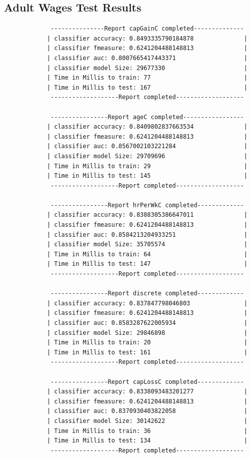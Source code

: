 \documentclass[a4paper,11pt]{scrreprt}
\begin{document}
\subsection{Adult Wages Test Results}
\begin{verbatim}
			 ---------------Report capGainC completed--------------
			| classifier accuracy: 0.8493335790184878              |
			| classifier fmeasure: 0.6241204488148813              |
			| classifier auc: 0.8007665417443371                   |
			| classifier model Size: 29677330                      |
			| Time in Millis to train: 77                          |
			| Time in Millis to test: 167                          |
			 -------------------Report completed-------------------

			 ----------------Report ageC completed-----------------
			| classifier accuracy: 0.8409802837663534              |
			| classifier fmeasure: 0.6241204488148813              |
			| classifier auc: 0.8567002103221284                   |
			| classifier model Size: 29709696                      |
			| Time in Millis to train: 29                          |
			| Time in Millis to test: 145                          |
			 -------------------Report completed-------------------
			
			 ----------------Report hrPerWkC completed-------------
			| classifier accuracy: 0.8388305386647011              |
			| classifier fmeasure: 0.6241204488148813              |
			| classifier auc: 0.8584213204933251                   |
			| classifier model Size: 35705574                      |
			| Time in Millis to train: 64                          |
			| Time in Millis to test: 147                          |
			 -------------------Report completed-------------------

			 ----------------Report discrete completed-------------
			| classifier accuracy: 0.837847798046803               |
			| classifier fmeasure: 0.6241204488148813              |
			| classifier auc: 0.8583287622005934                   |
			| classifier model Size: 29846898                      |
			| Time in Millis to train: 20                          |
			| Time in Millis to test: 161                          |
			 -------------------Report completed-------------------
			
			 ----------------Report capLossC completed-------------
			| classifier accuracy: 0.8338093483201277              |
			| classifier fmeasure: 0.6241204488148813              |
			| classifier auc: 0.8370930403822058                   |
			| classifier model Size: 30142622                      |
			| Time in Millis to train: 36                          |
			| Time in Millis to test: 134                          |
			 -------------------Report completed-------------------
			

\end{verbatim}
\end{document}
